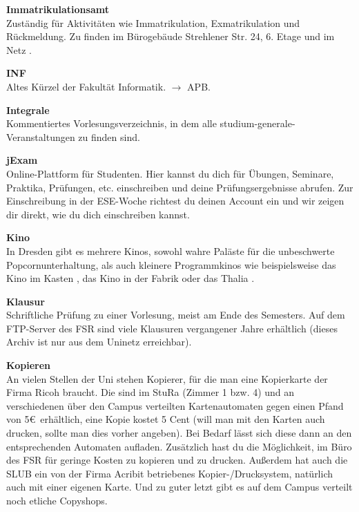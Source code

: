 \begin{multicols}{2}
\textbf{Immatrikulationsamt} \\
Zuständig für Aktivitäten wie Immatrikulation, Exmatrikulation und Rückmeldung.
Zu finden im Bürogebäude Strehlener Str. 24, 6. Etage und im Netz .

\textbf{INF} \\
Altes Kürzel der Fakultät Informatik.
$\rightarrow$ APB.

\textbf{Integrale} \\
Kommentiertes Vorlesungsverzeichnis, in dem alle studium-generale-Veranstaltungen zu finden sind. 

\textbf{jExam} \\
Online-Plattform für Studenten.
Hier kannst du dich für Übungen, Seminare, Praktika, Prüfungen, etc. einschreiben und deine Prüfungsergebnisse abrufen.
Zur Einschreibung in der ESE-Woche richtest du deinen Account ein und wir zeigen dir direkt, wie du dich einschreiben kannst. 

\textbf{Kino} \\
In Dresden gibt es mehrere Kinos, sowohl wahre Paläste für die unbeschwerte Popcornunterhaltung, als auch kleinere Programmkinos wie beispielsweise das Kino im Kasten , das Kino in der Fabrik  oder das Thalia .

\textbf{Klausur} \\
Schriftliche Prüfung zu einer Vorlesung, meist am Ende des Semesters.
Auf dem FTP-Server des FSR  sind viele Klausuren vergangener Jahre erhältlich (dieses Archiv ist nur aus dem Uninetz erreichbar).

\vfill\columnbreak

\textbf{Kopieren} \\
An vielen Stellen der Uni stehen Kopierer, für die man eine Kopierkarte der Firma Ricoh braucht. Die sind im StuRa (Zimmer 1 bzw. 4) und an verschiedenen über den Campus verteilten Kartenautomaten gegen einen Pfand von 5\euro\ erhältlich, eine Kopie kostet 5 Cent (will man mit den Karten auch drucken, sollte man dies vorher angeben).
Bei Bedarf lässt sich diese dann an den entsprechenden Automaten aufladen.
Zusätzlich hast du die Möglichkeit, im Büro des FSR für geringe Kosten zu kopieren und zu drucken.
Außerdem hat auch die SLUB ein von der Firma Acribit betriebenes Kopier-/Drucksystem, natürlich auch mit einer eigenen Karte.
Und zu guter letzt gibt es auf dem Campus verteilt noch etliche Copyshops.


\end{multicols}
